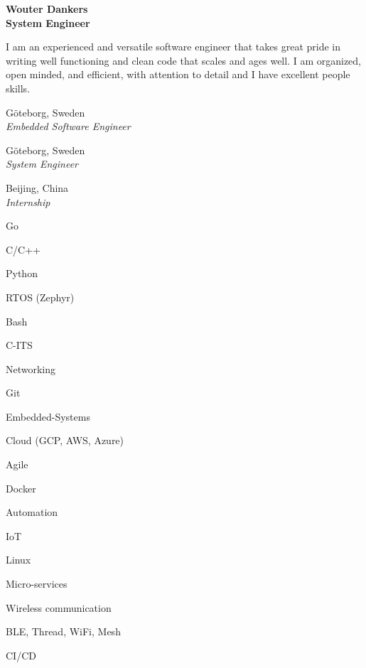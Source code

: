 \documentclass[a4paper,12pt,final]{memoir}
\begin{document}
\Huge\bfseries {\color{RoyalBlue} Wouter Dankers} \\
\Large\bfseries  System Engineer \\

\normalsize\normalfont

\begin{AboutMe}
I am an experienced and versatile software engineer that takes great pride in writing well functioning and clean code that scales and ages well. I am organized, open minded, and efficient, with attention to detail and I have excellent people skills.

\end{AboutMe}

 \hfill G\"oteborg, Sweden \\
\emph{Embedded Software Engineer}
\SmallSep

 \hfill G\"oteborg, Sweden \\
\emph{System Engineer}
\SmallSep

 \hfill Beijing, China \\
\emph{Internship}
\Sep

\begin{multicols}{3}
\begin{compactitem}[\color{RoyalBlue}$\circ$]
	\item Go
	\item C/C++ 
	\item Python
	\item RTOS (Zephyr) 
	\item Bash
	\item C-ITS
	\item Networking
	\item Git
	\item Embedded-Systems
	\item Cloud (GCP, AWS, Azure)
	\item Agile 
	\item Docker
	\item Automation
	\item IoT
	\item Linux
	\item Micro-services
	\item Wireless communication
	\item BLE, Thread, WiFi, Mesh
	\item CI/CD
\end{compactitem}
\end{multicols}
\Sep
\end{document}
